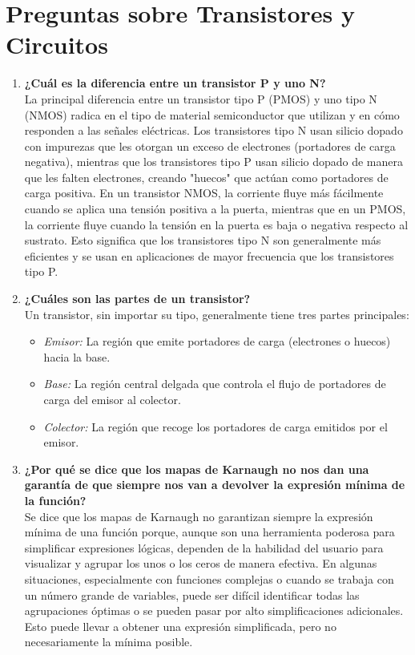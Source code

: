 \documentclass{article}
\begin{document}


\section*{Preguntas sobre Transistores y Circuitos}

\begin{enumerate}
    \item \textbf{¿Cuál es la diferencia entre un transistor P y uno N?} \\
    La principal diferencia entre un transistor tipo P (PMOS) y uno tipo N (NMOS) radica en el tipo de material semiconductor que utilizan y en cómo responden a las señales eléctricas. Los transistores tipo N usan silicio dopado con impurezas que les otorgan un exceso de electrones (portadores de carga negativa), mientras que los transistores tipo P usan silicio dopado de manera que les falten electrones, creando "huecos" que actúan como portadores de carga positiva. En un transistor NMOS, la corriente fluye más fácilmente cuando se aplica una tensión positiva a la puerta, mientras que en un PMOS, la corriente fluye cuando la tensión en la puerta es baja o negativa respecto al sustrato. Esto significa que los transistores tipo N son generalmente más eficientes y se usan en aplicaciones de mayor frecuencia que los transistores tipo P.

    \item \textbf{¿Cuáles son las partes de un transistor?} \\
    Un transistor, sin importar su tipo, generalmente tiene tres partes principales:
    \begin{itemize}
        \item \textit{Emisor:} La región que emite portadores de carga (electrones o huecos) hacia la base.
        \item \textit{Base:} La región central delgada que controla el flujo de portadores de carga del emisor al colector.
        \item \textit{Colector:} La región que recoge los portadores de carga emitidos por el emisor.
    \end{itemize}

    \item \textbf{¿Por qué se dice que los mapas de Karnaugh no nos dan una garantía de que siempre nos van a devolver la expresión mínima de la función?} \\
    Se dice que los mapas de Karnaugh no garantizan siempre la expresión mínima de una función porque, aunque son una herramienta poderosa para simplificar expresiones lógicas, dependen de la habilidad del usuario para visualizar y agrupar los unos o los ceros de manera efectiva. En algunas situaciones, especialmente con funciones complejas o cuando se trabaja con un número grande de variables, puede ser difícil identificar todas las agrupaciones óptimas o se pueden pasar por alto simplificaciones adicionales. Esto puede llevar a obtener una expresión simplificada, pero no necesariamente la mínima posible.


\end{enumerate}
\end{document}
